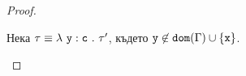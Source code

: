 \begin{proof}
\begin{itemize}
{      %
      
    }

    Нека $\tau \equiv \lambda~\texttt{y}:\texttt{c}~.~{\tau'}$, където $\texttt{y} \not\in \texttt{dom}(\Gamma) \cup \{\texttt{x}\}$.
    


\end{itemize}
\end{proof}
